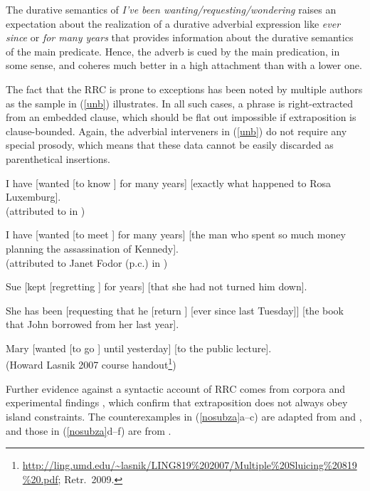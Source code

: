 \documentclass[output=paper
                ,modfonts
                ,nonflat
	        ,collection
	        ,collectionchapter
	        ,collectiontoclongg
 	        ,biblatex
                ,babelshorthands
                ,newtxmath
                ,draftmode
                ,colorlinks, citecolor=brown
]{./langsci/langscibook}
\begin{document}
\noindent
The  durative semantics  of   \emph{I've been wanting/requesting/wondering} 
 raises an expectation about the realization of   a durative  
adverbial expression like  \emph{ever since} or \emph{for many years} that
provides information about the durative semantics of the main predicate.
Hence, the adverb is cued by the main predication, in some sense, and 
  coheres much better in a high attachment than with a lower one.

The fact that the RRC is prone to exceptions has been noted by multiple authors as the sample in 
 (\ref{unb}) illustrates. In all such cases, a phrase is right-extracted
 from an embedded clause, which should be flat out impossible if extraposition is clause-bounded. Again, the adverbial  interveners in (\ref{unb}) do not require any special prosody, which means that
  these data cannot be easily discarded as parenthetical insertions.
  
\eal \label{unb}
\ex I have  [wanted [to know \spc] for many years] [exactly what happened to Rosa Luxemburg].\\
(attributed to \citealt{
witten} in \citealt[92n]{postal74})

\ex I have  [wanted [to meet \spc] for many years] [the man who spent so much money planning the assassination of Kennedy].\\
(attributed to Janet Fodor (p.c.) in \citealt[177]{gazdar})

\ex Sue [kept [regretting \spc] for years] [that she had not turned
him down].\\
\citep{eynde96}

\ex She has been [requesting that he [return \spc] [ever since last Tuesday]] [the book
that John borrowed from her last year].\\
\citep[251]{kayne00}

\ex  Mary [wanted [to go \spc] until yesterday]  [to the public lecture].\\
(Howard Lasnik 2007 course handout\footnote{\url{http://ling.umd.edu/~lasnik/LING819\%202007/Multiple\%20Sluicing\%20819\%20.pdf}; Retr.\ 2009.})
\zl



Further evidence against a syntactic account of RRC comes from  corpora 
\citep{Mueller2004d,Mueller2007c} and experimental findings  \citep{strunk08,strunk}, which confirm
 that  extraposition does  not always obey  island constraints.  The counterexamples in (\ref{nosubza}a--c) are adapted from
 \citet{strunk08} and \citet{strunk}, and those in (\ref{nosubza}d--f) are from \citet[863]{chavesrnr}.
\end{document}
